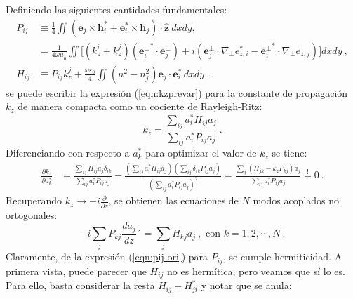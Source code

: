 Definiendo las siguientes cantidades fundamentales:
\begin{align}
	P_{ij} &\equiv \frac{1}{4} \iint \left( \textbf{e}_j \times \textbf{h}_i^* + \textbf{e}_i^* \times \textbf{h}_j \right) \cdot \hat{\textbf{z}} \ dxdy, \label{eqn:pij-ori} \\
	&= \frac{1}{4 \omega \mu_0} \iint \Big[ 
	(k_z^i + k_z^j) \left( {\textbf{e}_i^\perp}^* \cdot \textbf{e}_j^\perp \right)  + i \left( \textbf{e}_j^\perp \cdot \nabla_\perp e_{z,i}^* - {\textbf{e}_i^\perp}^* \cdot \nabla_\perp e_{z,j}  \right) \Big] dxdy \ , \label{eqn:pij-simpli} \\
	H_{ij} &\equiv P_{ij} k_z^j + \frac{\omega \varepsilon_0}{4} \iint (n^2-n_j^2) \textbf{e}_j \cdot \textbf{e}_i^* \, dxdy \ , \label{eqn:hij}
\end{align}
se puede escribir la expresión (\ref{eqn:kzprevar}) para la constante de propagación $k_z$ de manera compacta como un cociente de Rayleigh-Ritz:
\begin{equation}
	k_z = \frac{\sum_{ij} a_i^* H_{ij} a_j}{\sum_{ij} a_i^*P_{ij} a_j} \ .
\end{equation}
Diferenciando con respecto a $a_k^*$ para optimizar el valor de $k_z$ se tiene:
\begin{align}
	\frac{\partial k_z}{\partial a_k^*} &= \frac{\sum_{ij} H_{ij} a_j \delta_{ik}}{\sum_{ij} a_i^*P_{ij} a_j} - \frac{\left(\sum_{ij} a_i^* H_{ij} a_j\right) \left( 
	\sum_{ij} \delta_{ik} P_{ij} a_j \right) }{\left(\sum_{ij} a_i^*P_{ij} a_j\right)^2} = \frac{\sum_{j} \left(H_{jk}  - k_z P_{kj} \right) a_j}{\sum_{ij} a_i^* P_{ij}a_j} \overset{!}{=} 0 \ .
\end{align}
Recuperando $k_z \to -i\frac{\partial}{\partial z}$, se obtienen las ecuaciones de $N$ modos acoplados no ortogonales:
\begin{equation}
	-i \sum_{j} P_{kj} \frac{d a_j}{dz} ´= \sum_{j} H_{kj} a_j \ , \text{ con }k=1,2,\cdots,N \ . \label{eqn:non-ortho-CMT-eqs}
\end{equation}
Claramente, de la expresión (\ref{eqn:pij-ori}) para $P_{ij}$, se cumple hermiticidad. A primera vista, puede parecer que $H_{ij}$ no es hermítica, pero veamos que sí lo es. Para ello, basta considerar la resta $H_{ij} - H_{ji}^*$ y notar que se anula:
